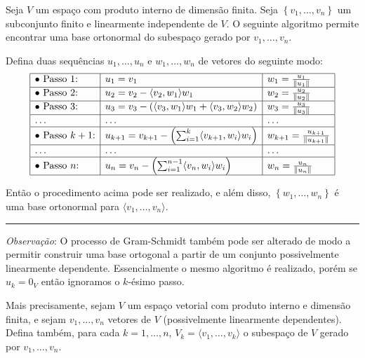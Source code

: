 \begin{theorem}
	Seja $V$ um espaço com produto interno de dimensão finita. Seja $\left\{v_1,\ldots,v_n\right\}$ um subconjunto finito e linearmente independente de $V$. O seguinte algoritmo permite encontrar uma base ortonormal do subespaço gerado por $v_1,\ldots,v_n$.
	
	Defina duas sequências $u_1,\ldots,u_n$ e $w_1,\ldots,w_n$ de vetores do seguinte modo:
	\[\begin{array}{| l | l | l| }\hline
	\bullet\ \text{Passo }1\text{:}
		& u_1=v_1
			& w_1=\frac{u_1}{\Vert u_1\Vert}\\\hline
	\bullet\ \text{Passo }2\text{:}
		& u_2=v_2-\langle v_2,w_1\rangle w_1
			& w_2=\frac{u_2}{\Vert u_2\Vert}\\\hline
	\bullet\ \text{Passo }3\text{:}
		& u_3=v_3-\left(\langle v_3,w_1\rangle w_1+\langle v_3,w_2\rangle w_2\right)
			& w_3=\frac{u_3}{\Vert u_3\Vert}\\\hline
	\ldots &\ldots&\ldots\\\hline
	\bullet\ \text{Passo }k+1\text{:}
		& u_{k+1}=v_{k+1}-\left(\sum_{i=1}^k\langle v_{k+1},w_i\rangle w_i\right)
			& w_{k+1}=\frac{u_{k+1}}{\Vert u_{k+1}\Vert}\\\hline
	\ldots &\ldots&\ldots\\\hline
	\bullet\ \text{Passo }n\text{:}
		& u_n=v_n-\left(\sum_{i=1}^{n-1}\langle v_n,w_i\rangle w_i\right)
			& w_n=\frac{u_n}{\Vert u_n\Vert}\\\hline\end{array}\]
	
	Então o procedimento acima pode ser realizado, e além disso, $\left\{w_1,\ldots,w_n\right\}$ é uma base ortonormal para $\langle v_1,\ldots,v_n\rangle$.
\hrule

\textit{Observação}: O processo de Gram-Schmidt também pode ser alterado de modo a permitir construir uma base ortogonal a partir de um conjunto possivelmente linearmente dependente. Essencialmente o mesmo algoritmo é realizado, porém se $u_k=0_V$ então ignoramos o $k$-ésimo passo.

Mais precisamente, sejam $V$ um espaço vetorial com produto interno e dimensão finita, e sejam $v_1,\ldots,v_n$ vetores de $V$ (possivelmente linearmente dependentes). Defina também, para cada $k=1,\ldots,n$, $V_k=\langle v_1,\ldots,v_k\rangle$ o subespaço de $V$ gerado por $v_1,\ldots,v_n$.


\end{theorem}
